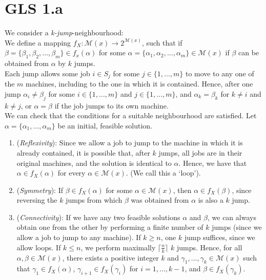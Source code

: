 \documentclass[12pt,a4paper,reqno]{article}
\begin{document}
\section*{GLS 1.a}

We consider a \textit{k-jump}-neighbourhood: \\

We define a mapping $f_X: \mathcal{M}(x) \rightarrow 2^{\mathcal{M}(x)}$, such that if $\beta = \{\beta_1,\beta_2,...,\beta_m \} \in f_x(\alpha)$ for some $\alpha = \{\alpha_1,\alpha_2,...,\alpha_m \} \in \mathcal{M}(x)$ if $\beta$ can be obtained from $\alpha$ by $k$ jumps. \\

Each jump allows some job $i \in S_j$ for some $j \in \{1,...,m\}$ to move to any one of the $m$ machines, including to the one in which it is contained. Hence, after one jump $\alpha_i \neq \beta_j$ for some $i \in \{1,...,m\}$ and $j \in \{1,...,m\}$, and $\alpha_k = \beta_k$ for $k \neq i$ and $k \neq j$, or $\alpha = \beta$ if the job jumps to its own machine. \\

We can check that the conditions for a suitable neighbourhood are satisfied. Let $\alpha = \{\alpha_1,...,\alpha_m\}$ be an initial, feasible solution.
\begin{enumerate}

\item (\textit{Reflexivity}): Since we allow a job to jump to the machine in which it is already contained, it is possible that, after $k$ jumps, all jobs are in their original machines, and the solution is identical to $\alpha$. Hence, we have that $\alpha \in f_X(\alpha)$ for every $\alpha \in \mathcal{M}(x)$. (We call this a `loop').

\item (\textit{Symmetry}): If $\beta \in f_X(\alpha)$ for some $\alpha \in \mathcal{M}(x)$, then $\alpha \in f_X(\beta)$, since reversing the $k$ jumps from which $\beta$ was obtained from $\alpha$ is also a $k$ jump. 

\item (\textit{Connectivity}): If we have any two feasible solutions $\alpha$ and $\beta$, we can always obtain one from the other by performing a finite number of $k$ jumps (since we allow a job to jump to any machine). If $k \geq n$, one $k$ jump suffices, since we allow loops. If $k \leq n$, we perform maximally $\lceil \frac{n}{k} \rceil$ $k$ jumps. Hence, for all $\alpha, \beta \in \mathcal{M}(x)$, there exists a positive integer $k$ and $\gamma_1,...,\gamma_k \in \mathcal{M}(x)$ such that $\gamma_1 \in f_X(\alpha)$, $\gamma_{i+1} \in f_X(\gamma_i)$ for $i=1,...,k-1$, and $\beta \in f_X(\gamma_k)$. 

\end{enumerate}
\end{document}
